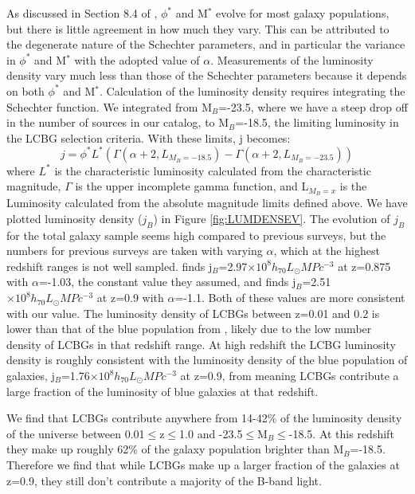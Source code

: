 \documentclass[manuscript]{aastex61}
\begin{document}
As discussed in Section 8.4 of \citet{2015ApJ...815...94B}, $\phi^{*}$ and M$^{*}$ evolve for most galaxy populations, but there is little agreement in how much they vary. This can be attributed to the degenerate nature of the Schechter parameters, and in particular the variance in $\phi^{*}$ and M$^{*}$ with the adopted value of $\alpha$. Measurements of the luminosity density vary much less than those of the Schechter parameters because it depends on both $\phi^{*}$ and M$^{*}$. Calculation of the luminosity density requires integrating the Schechter function. We integrated from M$_{B}$=-23.5, where we have a steep drop off in the number of sources in our catalog, to M$_{B}$=-18.5, the limiting luminosity in the LCBG selection criteria. With these limits, j becomes:
\begin{equation}
j=\phi^{*}L^{*}(\Gamma(\alpha+2,L_{M_{B}=-18.5})-\Gamma(\alpha+2,L_{M_{B}=-23.5}))
\end{equation}
where $L^{*}$ is the characteristic luminosity calculated from the characteristic magnitude, $\Gamma$ is the upper incomplete gamma function, and L$_{M_{B}=x}$ is the Luminosity calculated from the absolute magnitude limits defined above.  We have plotted luminosity density ($j_{B}$) in Figure \ref{fig:LUMDENSEV}. The evolution of $j_{B}$ for the total galaxy sample seems high compared to previous surveys, but the numbers for previous surveys are taken with varying $\alpha$, which at the highest redshift ranges is not well sampled. \citet{2009A&A...508.1217Z} finds j$_{B}$=2.97$\times10^{8}h_{70}L_{\odot}MPc^{-3}$ at z=0.875 with $\alpha$=-1.03, the constant value they assumed, and \citet{2015ApJ...815...94B} finds j$_{B}$=2.51$\times10^{8}h_{70}L_{\odot}MPc^{-3}$ at z=0.9 with $\alpha$=-1.1. Both of these values are more consistent with our value.  The luminosity density of LCBGs between z=0.01 and 0.2 is lower than that of the blue population from \citet{2015ApJ...815...94B}, likely due to the low number density of LCBGs in that redshift range. At high redshift the LCBG luminosity density is roughly consistent with the luminosity density of the blue population of galaxies, j$_{B}$=1.76$\times10^{8}h_{70}L_{\odot}MPc^{-3}$ at z=0.9, from \citet{2015ApJ...815...94B} meaning LCBGs contribute a large fraction of the luminosity of blue galaxies at that redshift. 

We find that LCBGs contribute anywhere from 14-42\% of the luminosity density of the universe between 0.01$\leq$z$\leq$1.0 and -23.5$\leq$M$_{B}\leq$-18.5. At this redshift they make up roughly 62\% of the galaxy population brighter than M$_{B}$=-18.5. Therefore we find that while LCBGs make up a larger fraction of the galaxies at z=0.9, they still don't contribute a majority of the B-band light. 
\end{document}
